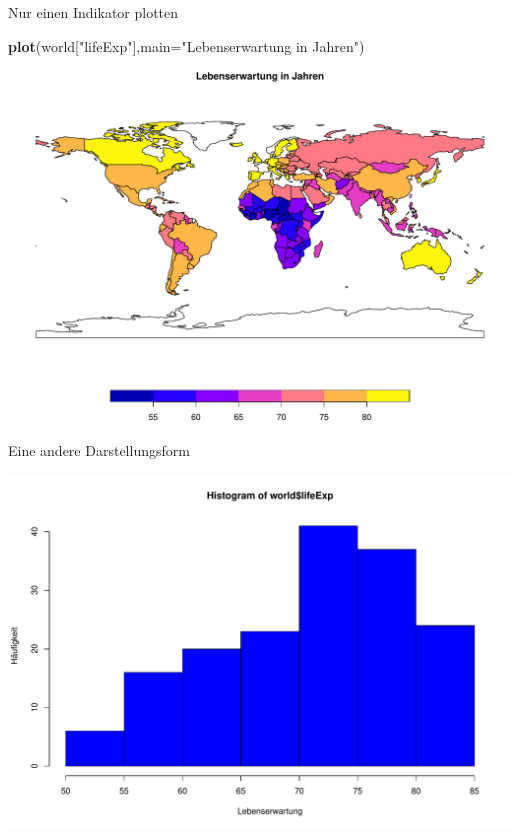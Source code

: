 \documentclass[ignorenonframetext,]{beamer}
\newenvironment{Shaded}{\begin{snugshade}}{\end{snugshade}}
\newcommand{\KeywordTok}[1]{\textcolor[rgb]{0.13,0.29,0.53}{\textbf{#1}}}
\newcommand{\DataTypeTok}[1]{\textcolor[rgb]{0.13,0.29,0.53}{#1}}
\newcommand{\StringTok}[1]{\textcolor[rgb]{0.31,0.60,0.02}{#1}}
\newcommand{\OperatorTok}[1]{\textcolor[rgb]{0.81,0.36,0.00}{\textbf{#1}}}
\newcommand{\NormalTok}[1]{#1}
\begin{document}
\begin{frame}[fragile]{Nur einen Indikator plotten}

\begin{Shaded}
\begin{Highlighting}[]
\KeywordTok{plot}\NormalTok{(world[}\StringTok{"lifeExp"}\NormalTok{],}\DataTypeTok{main=}\StringTok{"Lebenserwartung in Jahren"}\NormalTok{)}
\end{Highlighting}
\end{Shaded}

\includegraphics{A1_HalloWelt_files/figure-beamer/unnamed-chunk-20-1.pdf}

\end{frame}

\begin{frame}[fragile]{Eine andere Darstellungsform}

\begin{Shaded}
\end{Shaded}

\includegraphics{A1_HalloWelt_files/figure-beamer/unnamed-chunk-21-1.pdf}

\end{frame}
\end{document}
